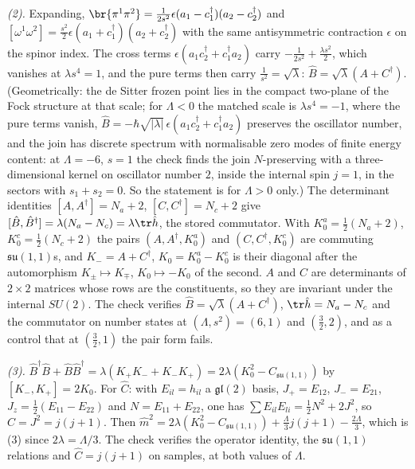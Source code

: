 \emph{(2).} Expanding, $\br{\pi^{1}\pi^{2}} = \tfrac{1}{2s^{2}}\epsilon(a_{1} - c_{1}^{\dagger})(a_{2} - c_{2}^{\dagger})$ and $[\omega^{1}\omega^{2}] = \tfrac{s^{2}}{2}\epsilon(a_{1} + c_{1}^{\dagger})(a_{2} + c_{2}^{\dagger})$ with the same antisymmetric contraction $\epsilon$ on the spinor index. The cross terms $\epsilon(a_{1}c_{2}^{\dagger} + c_{1}^{\dagger}a_{2})$ carry $-\tfrac{1}{2s^{2}} + \tfrac{\lambda s^{2}}{2}$, which vanishes at $\lambda s^{4} = 1$, and the pure terms then carry $\tfrac{1}{s^{2}} = \sqrt\lambda$: $\hat B = \sqrt\lambda(A + C^{\dagger})$. (Geometrically: the de Sitter frozen point lies in the compact two-plane of the Fock structure at that scale; for $\Lambda < 0$ the matched scale is $\lambda s^{4} = -1$, where the pure terms vanish, $\hat B = -\hbar\sqrt{|\lambda|}\,\epsilon(a_{1}c_{2}^{\dagger} + c_{1}^{\dagger}a_{2})$ preserves the oscillator number, and the join has discrete spectrum with normalisable zero modes of finite energy content: at $\Lambda = -6$, $s = 1$ the check finds the join $N$-preserving with a three-dimensional kernel on oscillator number $2$, inside the internal spin $j = 1$, in the sectors with $s_{1} + s_{2} = 0$. So the statement is for $\Lambda > 0$ only.) The determinant identities $[A, A^{\dagger}] = N_{a} + 2$, $[C, C^{\dagger}] = N_{c} + 2$ give $[\hat B, \hat B^{\dagger}] = \lambda(N_{a} - N_{c}) = \lambda\tr\hat h$, the stored commutator. With $K_{0}^{a} = \tfrac12(N_{a} + 2)$, $K_{0}^{c} = \tfrac12(N_{c} + 2)$ the pairs $(A, A^{\dagger}, K_{0}^{a})$ and $(C, C^{\dagger}, K_{0}^{c})$ are commuting $\mathfrak{su}(1,1)$s, and $K_{-} = A + C^{\dagger}$, $K_{0} = K_{0}^{a} - K_{0}^{c}$ is their diagonal after the automorphism $K_{\pm} \mapsto K_{\mp}$, $K_{0} \mapsto -K_{0}$ of the second. $A$ and $C$ are determinants of $2 \times 2$ matrices whose rows are the constituents, so they are invariant under the internal $SU(2)$. The check verifies $\hat B = \sqrt\lambda(A + C^{\dagger})$, $\tr\hat h = N_{a} - N_{c}$ and the commutator on number states at $(\Lambda, s^{2}) = (6, 1)$ and $(\tfrac32, 2)$, and as a control that at $(\tfrac32, 1)$ the pair form fails.

\emph{(3).} $\hat B^{\dagger}\hat B + \hat B\hat B^{\dagger} = \lambda(K_{+}K_{-} + K_{-}K_{+}) = 2\lambda(K_{0}^{2} - C_{\mathfrak{su}(1,1)})$ by $[K_{-}, K_{+}] = 2K_{0}$. For $\hat C$: with $E_{il} = \hat h_{il}$ a $\mathfrak{gl}(2)$ basis, $J_{+} = E_{12}$, $J_{-} = E_{21}$, $J_{z} = \tfrac12(E_{11} - E_{22})$ and $N = E_{11} + E_{22}$, one has $\sum E_{il}E_{li} = \tfrac12N^{2} + 2J^{2}$, so $\hat C = J^{2} = j(j+1)$. Then $\hat m^{2} = 2\lambda(K_{0}^{2} - C_{\mathfrak{su}(1,1)}) + \tfrac{\Lambda}{3}j(j+1) - \tfrac{2\Lambda}{3}$, which is (3) since $2\lambda = \Lambda/3$. The check verifies the operator identity, the $\mathfrak{su}(1,1)$ relations and $\hat C = j(j+1)$ on samples, at both values of $\Lambda$.

